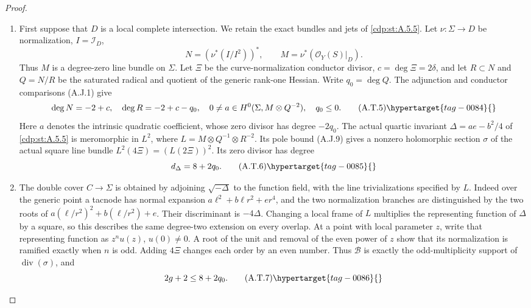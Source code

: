 \begin{proof}
\begin{enumerate}[label={$\langle1\rangle$\arabic*.},leftmargin=*]
\item First suppose that $D$ is a local complete intersection.
We retain the exact bundles and jets of \ref{cdp:st:A.5.5}.
Let $\nu:\Sigma\to D$ be normalization, $I=\mathcal I_D$,
\[
 N=(\nu^*(I/I^2))^*,\qquad
 M=\nu^*(\mathcal O_Y(S)|_D).
\]
Thus $M$ is a degree-zero line bundle on $\Sigma$.
Let $\Xi$ be the curve-normalization
conductor divisor, $c=\deg\Xi=2\delta$, and let
$R\subset N$ and $Q=N/R$ be the saturated radical and
quotient of the generic rank-one Hessian. Write
$q_0=\deg Q$. The adjunction and conductor comparisons
(A.J.1) give
\[
 \deg N=-2+c,\quad \deg R=-2+c-q_0,\quad
 0\ne a\in H^0(\Sigma,M\otimes Q^{-2}),\quad q_0\le0.
                                                        \tag{A.T.5}\hypertarget{tag-0084}{}\label{cdp:eq:A.T.5}
\]
Here $a$ denotes the intrinsic quadratic coefficient,
whose zero divisor has degree $-2q_0$.
The actual quartic invariant $\Delta=ae-b^2/4$ of
\ref{cdp:st:A.5.5} is meromorphic in
$L^2$, where $L=M\otimes Q^{-1}\otimes R^{-2}$.
Its pole bound (A.J.9) gives a nonzero holomorphic
section $\sigma$ of the actual square line bundle
$L^2(4\Xi)=(L(2\Xi))^2$. Its zero divisor has degree
\[
               d_\Delta=8+2q_0.                    \tag{A.T.6}\hypertarget{tag-0085}{}\label{cdp:eq:A.T.6}
\]

\item The double cover $C\to\Sigma$ is obtained by adjoining
$\sqrt{-\Delta}$ to the function field, with the line
trivializations specified by $L$. Indeed over the
generic point a tacnode has normal expansion
$a\ell^2+b\ell r^2+er^4$, and the two normalization
branches are distinguished by the two roots of
$a(\ell/r^2)^2+b(\ell/r^2)+e$. Their discriminant
is $-4\Delta$. Changing a local frame of $L$ multiplies
the representing function of $\Delta$ by a square,
so this describes the same degree-two extension on
every overlap. At a point with local parameter $z$,
write that representing function as $z^n u(z)$,
$u(0)\ne0$. A root of the unit and removal of the
even power of $z$ show that its normalization is
ramified exactly when $n$ is odd. Adding $4\Xi$ changes
each order by an even number. Thus $\mathcal B$ is
exactly the odd-multiplicity support of
$\operatorname{div}(\sigma)$, and
\[
                  2g+2\le 8+2q_0.                 \tag{A.T.7}\hypertarget{tag-0086}{}\label{cdp:eq:A.T.7}
\]


\end{enumerate}
\end{proof}

